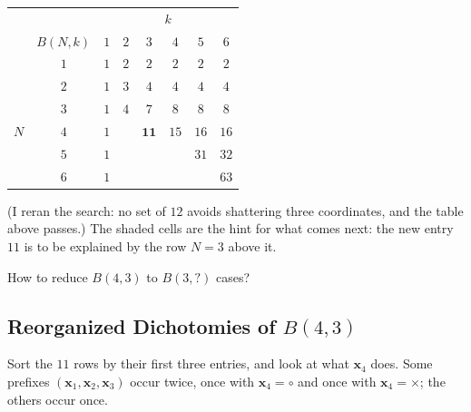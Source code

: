 \begin{center}
\begin{tabular}[t]{@{}c|cccc@{}}
    \end{tabular}
    \qquad
    \begin{tabular}[t]{@{}cc|cccccc@{}}
        \toprule
        & & \multicolumn{6}{c}{\(k\)}\\
        & \(B(N, k)\) & \(1\) & \(2\) & \(3\) & \(4\) & \(5\) & \(6\)\\
        \midrule
        & \(1\) & \(1\) & \(2\) & \(2\) & \(2\) & \(2\) & \(2\)\\
        & \(2\) & \(1\) & \(3\) & \(4\) & \(4\) & \(4\) & \(4\)\\
        \rowcolor{singlerowalt}
        & \(3\) & \(1\) & \(4\) & \(7\) & \(8\) & \(8\) & \(8\)\\
        \(N\) & \(4\) & \(1\) & & \cellcolor{singlerowalt}%
        \textcolor{orange!85!black}{\(\bm{11}\)} & \(15\) & \(16\) & \(16\)\\
        & \(5\) & \(1\) & & & & \(31\) & \(32\)\\
        & \(6\) & \(1\) & & & & & \(63\)\\
        \bottomrule
    \end{tabular}
\end{center}

(I reran the search: no set of \(12\) avoids shattering three coordinates, and
the table above passes.) The shaded cells are the hint for what comes next: the new entry \(11\) is to
be explained by the row \(N = 3\) above it.

\begin{question}\label{q:reduce}
    How to reduce \(B(4, 3)\) to \(B(3, ?)\) cases?
\end{question}

\subsection{Reorganized Dichotomies of \texorpdfstring{\(B(4, 3)\)}{B(4, 3)}}

Sort the \(11\) rows by their first three entries, and look at what
\(\bm{x}_4\) does. Some prefixes \((\bm{x}_1, \bm{x}_2, \bm{x}_3)\) occur twice,
once with \(\bm{x}_4 = \circ\) and once with \(\bm{x}_4 = \times\); the others
occur once.

